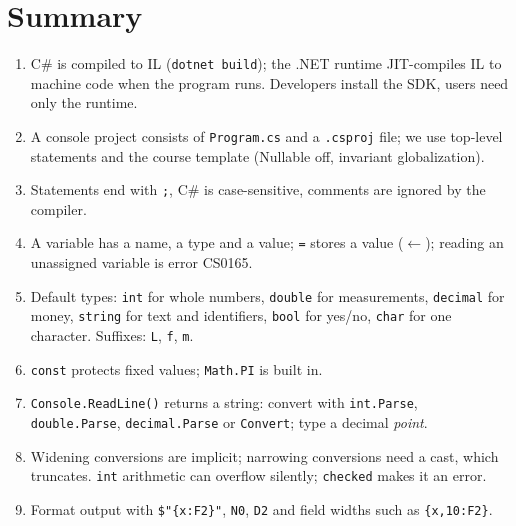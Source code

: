 \section{Summary}\label{sec:summary}
\begin{enumerate}[leftmargin=*,itemsep=1pt]
  \item C\# is compiled to IL (\texttt{dotnet build}); the .NET runtime JIT-compiles IL to machine code when the program runs. Developers install the SDK, users need only the runtime.
  \item A console project consists of \texttt{Program.cs} and a \texttt{.csproj} file; we use top-level statements and the course template (Nullable off, invariant globalization).
  \item Statements end with \texttt{;}, C\# is case-sensitive, comments are ignored by the compiler.
  \item A variable has a name, a type and a value; \texttt{=} stores a value ($\gets$); reading an unassigned variable is error CS0165.
  \item Default types: \texttt{int} for whole numbers, \texttt{double} for measurements, \texttt{decimal} for money, \texttt{string} for text and identifiers, \texttt{bool} for yes/no, \texttt{char} for one character. Suffixes: \texttt{L}, \texttt{f}, \texttt{m}.
  \item \texttt{const} protects fixed values; \texttt{Math.PI} is built in.
  \item \texttt{Console.ReadLine()} returns a string: convert with \texttt{int.Parse}, \texttt{double.Parse}, \texttt{decimal.Parse} or \texttt{Convert}; type a decimal \emph{point}.
  \item Widening conversions are implicit; narrowing conversions need a cast, which truncates. \texttt{int} arithmetic can overflow silently; \texttt{checked} makes it an error.
  \item Format output with \texttt{\$"\{x:F2\}"}, \texttt{N0}, \texttt{D2} and field widths such as \texttt{\{x,10:F2\}}.
\end{enumerate}

